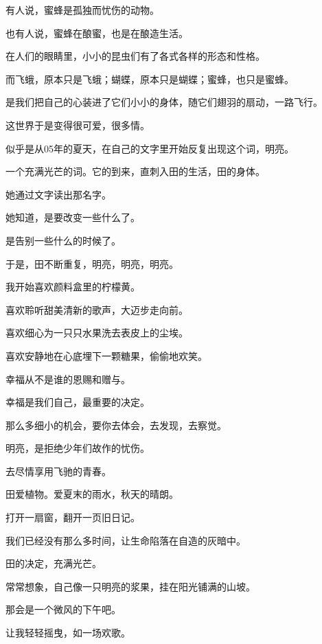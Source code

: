 \documentclass[12pt,a4paper]{article}
\begin{document}
		有人说，蜜蜂是孤独而忧伤的动物。\par
		也有人说，蜜蜂在酿蜜，也是在酿造生活。\par
		在人们的眼睛里，小小的昆虫们有了各式各样的形态和性格。\par
		而飞蛾，原本只是飞蛾；蝴蝶，原本只是蝴蝶；蜜蜂，也只是蜜蜂。\par
		是我们把自己的心装进了它们小小的身体，随它们翅羽的扇动，一路飞行。\par
		这世界于是变得很可爱，很多情。

	\endwriting



		似乎是从05年的夏天，在自己的文字里开始反复出现这个词，明亮。\par
		一个充满光芒的词。它的到来，直刺入田的生活，田的身体。\par
		她通过文字读出那名字。\par
		她知道，是要改变一些什么了。\par
		是告别一些什么的时候了。

		于是，田不断重复，明亮，明亮，明亮。

		我开始喜欢颜料盒里的柠檬黄。\par
		喜欢聆听甜美清新的歌声，大迈步走向前。\par
		喜欢细心为一只只水果洗去表皮上的尘埃。\par
		喜欢安静地在心底埋下一颗糖果，偷偷地欢笑。\par
		幸福从不是谁的恩赐和赠与。\par
		幸福是我们自己，最重要的决定。\par
		那么多细小的机会，要你去体会，去发现，去察觉。\par
		明亮，是拒绝少年们故作的忧伤。\par
		去尽情享用飞驰的青春。

		田爱植物。爱夏末的雨水，秋天的晴朗。\par
		打开一扇窗，翻开一页旧日记。\par
		我们已经没有那么多时间，让生命陷落在自造的灰暗中。\par
		田的决定，充满光芒。

		常常想象，自己像一只明亮的浆果，挂在阳光铺满的山坡。\par
		那会是一个微风的下午吧。\par
		让我轻轻摇曳，如一场欢歌。

	\endwriting


\end{document}
